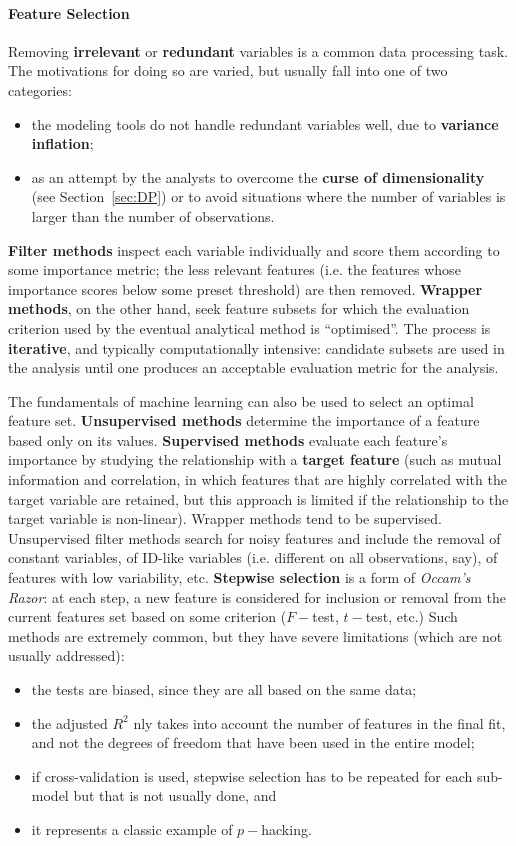 \paragraph{Feature Selection}
Removing \textbf{irrelevant} or \textbf{redundant} variables is a common data processing task. The motivations for doing so are varied, but usually fall into one of two categories: 
\begin{itemize}[noitemsep]
\item the modeling tools do not handle redundant variables well, due to \textbf{variance inflation};
\item as an attempt by the analysts to overcome the \textbf{curse of dimensionality} (see Section~\ref{sec:DP}) or to avoid situations where the number of variables is larger than the number of observations. 
\end{itemize}
\textbf{Filter methods} inspect each variable individually and score them according to some importance metric; the less relevant features (i.e. the features whose importance scores below some preset threshold) are then removed. \textbf{Wrapper methods}, on the other hand, seek feature subsets for which the evaluation criterion used by the eventual analytical method is ``optimised''. The process is \textbf{iterative}, and typically computationally intensive: candidate subsets are used in the analysis until one produces an acceptable evaluation metric for the analysis. \par The fundamentals of machine learning can also be used to select an optimal feature set. \textbf{Unsupervised methods} determine the importance of a feature based only on its values. \textbf{Supervised methods} evaluate each feature's importance by studying the relationship with a \textbf{target feature} (such as mutual information and correlation, in which features that are highly correlated with the target variable are retained, but this approach is limited if the relationship to the target variable is non-linear). Wrapper methods tend to be supervised. Unsupervised filter methods search for noisy features and include the removal of  constant variables, of ID-like variables (i.e. different on all observations, say), of features with low variability, etc. \newl \textbf{Stepwise selection} is a form of \textit{Occam's Razor}: at each step, a new feature is considered for inclusion or removal from the current features set based on some criterion ($F-$test, $t-$test, etc.) Such methods are extremely common, but they have severe limitations (which are not usually addressed): 
\begin{itemize}[noitemsep]
\item the tests are biased, since they are all based on the same data;
\item the adjusted $R^2$ nly takes into account the number of features in the final fit, and not the degrees of freedom that have been used in the entire model;
\item if cross-validation is used, stepwise selection has to be repeated for each sub-model but that is not usually done, and 
\item it represents a classic example of $p-$hacking.
\end{itemize}
